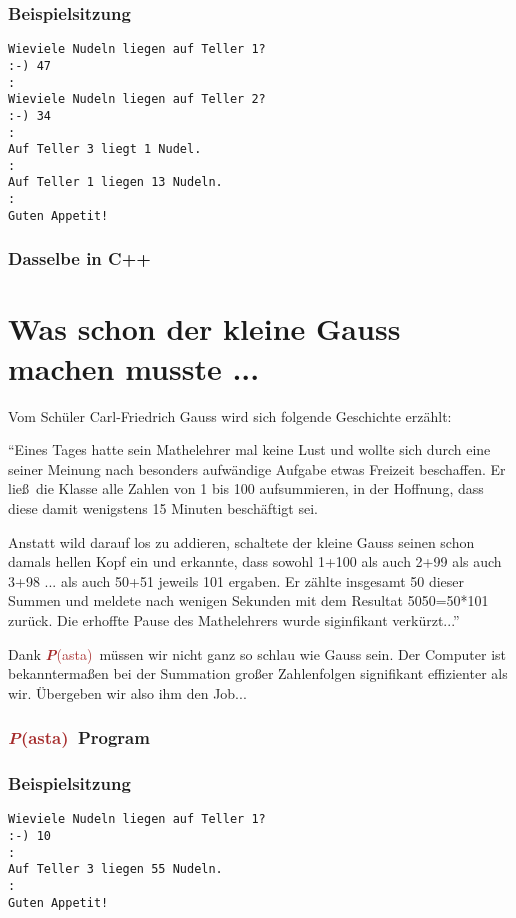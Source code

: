 \documentclass[11pt]{book}
\newcommand{\Pasta}{\textcolor{brown}{{\bf \em P}{\scriptsize{(asta)}}}}
\begin{document}
\subsubsection{Beispielsitzung}
\color{purple}
\begin{lstlisting}
Wieviele Nudeln liegen auf Teller 1?
:-) 47
:
Wieviele Nudeln liegen auf Teller 2?
:-) 34
:
Auf Teller 3 liegt 1 Nudel.
:
Auf Teller 1 liegen 13 Nudeln.
:
Guten Appetit!
\end{lstlisting}
\color{black}

\subsubsection{Dasselbe in C++}



\section{Was schon der kleine Gauss machen musste ...}

Vom Sch\"uler Carl-Friedrich Gauss wird sich folgende Geschichte
erz\"ahlt: 

``Eines Tages hatte sein Mathelehrer mal keine Lust und 
wollte sich durch eine seiner Meinung nach besonders aufw\"andige 
Aufgabe etwas Freizeit beschaffen. Er lie\ss\ die Klasse alle Zahlen 
von 1 bis 100 aufsummieren, in der Hoffnung, dass diese damit wenigstens
15 Minuten besch\"aftigt sei. 

Anstatt wild darauf los zu addieren, schaltete der kleine Gauss seinen
schon damals hellen Kopf ein und erkannte, dass sowohl 1+100 als auch
2+99 als auch 3+98 ... als auch 50+51 jeweils 101 ergaben. 
Er z\"ahlte insgesamt 50 dieser Summen und meldete nach wenigen Sekunden 
mit dem Resultat 5050=50*101 zur\"uck. Die erhoffte Pause des 
Mathelehrers wurde siginfikant verk\"urzt...''

Dank \Pasta\ m\"ussen wir nicht ganz so schlau wie Gauss sein.
Der Computer ist bekannterma\ss en bei der Summation gro\ss er
Zahlenfolgen signifikant effizienter als wir. \"Ubergeben wir 
also ihm den Job...

\subsubsection{\Pasta\ Program}
\color{blue}

\color{black}

\subsubsection{Beispielsitzung}
\color{purple}
\begin{lstlisting}
Wieviele Nudeln liegen auf Teller 1?
:-) 10
:
Auf Teller 3 liegen 55 Nudeln.
:
Guten Appetit!
\end{lstlisting}
\color{black}
\end{document}
